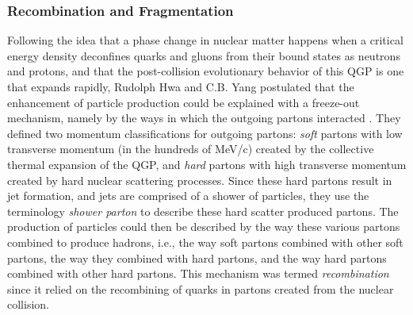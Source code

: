 \subsubsection{Recombination and Fragmentation}
Following the idea that a phase change in nuclear matter happens when a critical energy density deconfines quarks and gluons from their bound states as neutrons and protons, and that the post-collision evolutionary behavior of this QGP is one that expands rapidly, Rudolph Hwa and C.B. Yang postulated that the enhancement of particle production could be explained with a freeze-out mechanism, namely by the ways in which the outgoing partons interacted \citep{PhysRevC.70.024905}. They defined two momentum classifications for outgoing partons: \textit{soft} partons with low transverse momentum (in the hundreds of MeV/c) created by the collective thermal expansion of the QGP, and \textit{hard} partons with high transverse momentum created by hard nuclear scattering processes. Since these hard partons result in jet formation, and jets are comprised of a shower of particles, they use the terminology \textit{shower parton} to describe these hard scatter produced partons. The production of particles could then be described by the way these various partons combined to produce hadrons, i.e., the way soft partons combined with other soft partons, the way they combined with hard partons, and the way hard partons combined with other hard partons. This mechanism was termed \textit{recombination} since it relied on the recombining of quarks in partons created from the nuclear collision.

